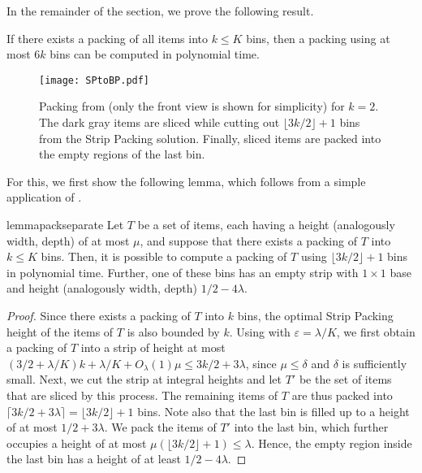 \documentclass[a4paper,UKenglish,cleveref, autoref, thm-restate]{lipics-v2021}
\renewcommand{\epsilon}{\lambda}
\begin{document}
In the remainder of the section, we prove the following result.

\begin{proposition}
\label{pro:sixapprox}
    If there exists a packing of all items into $k\le K$ bins, then a packing using at most $6k$ bins can be computed in polynomial time.
\end{proposition}

\begin{figure}
    \centering
    \texttt{[image: SPtoBP.pdf]}
    \caption{Packing from  (only the front view is shown for simplicity) for $k=2$. The dark gray items are sliced while cutting out $\lfloor 3k/2 \rfloor+1 $ bins from the Strip Packing solution. Finally, sliced items are packed into the empty regions of the last bin.}
    \label{fig:sptobp}
\end{figure}

For this, we first show the following lemma, which follows from a simple application of . 


\begin{restatable}{lemma}{packseparate}
\label{thm:packseparate}
    Let $T$ be a set of items, each having a height (analogously width, depth) of at most $\mu$, and suppose that there exists a packing of $T$ into $k\le K$ bins. Then, it is possible to compute a packing of $T$ using $\lfloor 3k/2 \rfloor + 1$ bins in polynomial time. Further, one of these bins has an empty strip with $1\times 1$ base and height (analogously width, depth) $1/2-4\epsilon$. 
\end{restatable}

\begin{proof}
    Since there exists a packing of $T$ into $k$ bins, the optimal Strip Packing height of the items of $T$ is also bounded by $k$. Using  with $\varepsilon = \epsilon/K$, we first obtain a packing of $T$ into a strip of height at most $(3/2+\epsilon/K)k + \epsilon/K + O_{\lambda}(1)\mu\le 3k/2 + 3\epsilon$, since $\mu \le \delta$ and $\delta$ is sufficiently small. Next, we cut the strip at integral heights and let $T'$ be the set of items that are sliced by this process. The remaining items of $T$ are thus packed into $\lceil 3k/2 + 3\epsilon \rceil = \lfloor 3k/2 \rfloor + 1$ bins. Note also that the last bin is filled up to a height of at most $1/2+3\epsilon$. We pack the items of $T'$ into the last bin, which further occupies a height of at most $\mu(\lfloor 3k/2 \rfloor + 1) \le \epsilon$. Hence, the empty region inside the last bin has a height of at least $1/2 - 4\epsilon$.
\end{proof}
\end{document}
